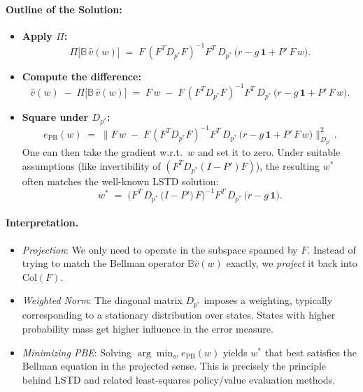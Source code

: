 \paragraph{Outline of the Solution:}
\begin{itemize}
    \item \textbf{Apply $\Pi$:} 
    \[
    \Pi\bigl[\mathbb{B}\,\hat{v}(w)\bigr]
    \;=\;
    F\,(F^T D_{p^*} F)^{-1} F^T\,D_{p^*}\,\bigl(r - g\,\mathbf{1} + P'\,F\,w\bigr).
    \]
    
    \item \textbf{Compute the difference:}
    \[
    \hat{v}(w) 
    \;-\;
    \Pi\bigl[\mathbb{B}\,\hat{v}(w)\bigr]
    \;=\;
    F\,w
    \;-\;
    F\,(F^T D_{p^*} F)^{-1} F^T\,D_{p^*}\,\bigl(r - g\,\mathbf{1} + P'\,F\,w\bigr).
    \]
    
    \item \textbf{Square under $D_{p^*}$:}
    \[
    e_{\mathrm{PB}}(w)
    \;=\;
    \bigl\|
    F\,w
    \;-\;
    F\,(F^T D_{p^*} F)^{-1} F^T\,D_{p^*}\,\bigl(r - g\,\mathbf{1} + P'\,F\,w\bigr)
    \bigr\|_{D_{p^*}}^2.
    \]
    One can then take the gradient w.r.t.\ $w$ and set it to zero. 
    Under suitable assumptions (like invertibility of $(F^T D_{p^*} (I - P') F)$), 
    the resulting $w^*$ often matches the well-known LSTD solution:
    \[
    w^*
    \;=\;
    \bigl(F^T\,D_{p^*}\,\bigl(I - P'\bigr)\,F\bigr)^{-1}
    F^T\,D_{p^*}\,\bigl(r - g\,\mathbf{1}\bigr).
    \]
\end{itemize}

\paragraph{Interpretation.}
\begin{itemize}
    \item \emph{Projection}: We only need to operate in the subspace spanned by $F$. Instead of trying to match the Bellman operator $\mathbb{B}\hat{v}(w)$ exactly, we \emph{project} it back into $\text{Col}(F)$.
    \item \emph{Weighted Norm}: The diagonal matrix $D_{p^*}$ imposes a weighting, typically corresponding to a stationary distribution over states. States with higher probability mass get higher influence in the error measure.
    \item \emph{Minimizing PBE}: Solving $\arg\min_w e_{\mathrm{PB}}(w)$ yields $w^*$ that best satisfies the Bellman equation in the projected sense. This is precisely the principle behind LSTD and related least-squares policy/value evaluation methods.
\end{itemize}

